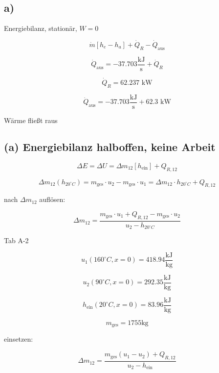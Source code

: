 

\subsection*{a)}
Energiebilanz, stationär, \( W = 0 \)

\[
\dot{m} \left[ h_e - h_a \right] + \dot{Q}_R - \dot{Q}_{\text{aus}}
\]

\[
\dot{Q}_{\text{aus}} = -37.703 \frac{\text{kJ}}{\text{s}} + \dot{Q}_R
\]

\[
\dot{Q}_R = 62.237 \text{ kW}
\]

\[
\dot{Q}_{\text{aus}} = -37.703 \frac{\text{kJ}}{\text{s}} + 62.3 \text{ kW}
\]

Wärme fließt raus

\subsection*{(a) Energiebilanz halboffen, keine Arbeit}

\[
\Delta E = \Delta U = \Delta m_{12} \left[ h_{\text{ein}} \right] + Q_{R,12}
\]

\[
\Delta m_{12} (h_{20^\circ C}) = m_{\text{ges}} \cdot u_2 - m_{\text{ges}} \cdot u_1 = \Delta m_{12} \cdot h_{20^\circ C} + Q_{R,12}
\]

nach \(\Delta m_{12}\) auflösen:

\[
\Delta m_{12} = \frac{m_{\text{ges}} \cdot u_1 + Q_{R,12} - m_{\text{ges}} \cdot u_2}{u_2 - h_{20^\circ C}}
\]

Tab A-2

\[
u_1 (160^\circ C, x=0) = 418.94 \frac{\text{kJ}}{\text{kg}}
\]

\[
u_2 (90^\circ C, x=0) = 292.35 \frac{\text{kJ}}{\text{kg}}
\]

\[
h_{\text{ein}} (20^\circ C, x=0) = 83.96 \frac{\text{kJ}}{\text{kg}}
\]

\[
m_{\text{ges}} = 1755 \text{kg}
\]

einsetzen:

\[
\Delta m_{12} = \frac{m_{\text{ges}} (u_1 - u_2) + Q_{R,12}}{u_2 - h_{\text{ein}}}
\]